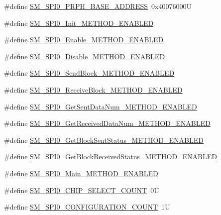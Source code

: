 \begin{DoxyCompactItemize}
\item 
\#define \hyperlink{group___s_m___s_p_i0__module_gadcb4c41a999e49a2af44097b78f649e5}{S\-M\-\_\-\-S\-P\-I0\-\_\-\-P\-R\-P\-H\-\_\-\-B\-A\-S\-E\-\_\-\-A\-D\-D\-R\-E\-S\-S}~0x40076000\-U
\item 
\#define \hyperlink{group___s_m___s_p_i0__module_gaa6b6e643013a5c7cc17c0c739c49f949}{S\-M\-\_\-\-S\-P\-I0\-\_\-\-Init\-\_\-\-M\-E\-T\-H\-O\-D\-\_\-\-E\-N\-A\-B\-L\-E\-D}
\item 
\#define \hyperlink{group___s_m___s_p_i0__module_ga7f2a9dc3bb16477dbf2980b1cf9d9b4f}{S\-M\-\_\-\-S\-P\-I0\-\_\-\-Enable\-\_\-\-M\-E\-T\-H\-O\-D\-\_\-\-E\-N\-A\-B\-L\-E\-D}
\item 
\#define \hyperlink{group___s_m___s_p_i0__module_ga62e6171426870273264bc9b00d3c099f}{S\-M\-\_\-\-S\-P\-I0\-\_\-\-Disable\-\_\-\-M\-E\-T\-H\-O\-D\-\_\-\-E\-N\-A\-B\-L\-E\-D}
\item 
\#define \hyperlink{group___s_m___s_p_i0__module_ga42771fed4a25a87f049c8a78d13220d2}{S\-M\-\_\-\-S\-P\-I0\-\_\-\-Send\-Block\-\_\-\-M\-E\-T\-H\-O\-D\-\_\-\-E\-N\-A\-B\-L\-E\-D}
\item 
\#define \hyperlink{group___s_m___s_p_i0__module_ga60b81caadf218efa734fdca08c338e8d}{S\-M\-\_\-\-S\-P\-I0\-\_\-\-Receive\-Block\-\_\-\-M\-E\-T\-H\-O\-D\-\_\-\-E\-N\-A\-B\-L\-E\-D}
\item 
\#define \hyperlink{group___s_m___s_p_i0__module_ga743f369621e807827351bef66d506609}{S\-M\-\_\-\-S\-P\-I0\-\_\-\-Get\-Sent\-Data\-Num\-\_\-\-M\-E\-T\-H\-O\-D\-\_\-\-E\-N\-A\-B\-L\-E\-D}
\item 
\#define \hyperlink{group___s_m___s_p_i0__module_ga1d1346d5713d7651a7610a945bb4743a}{S\-M\-\_\-\-S\-P\-I0\-\_\-\-Get\-Received\-Data\-Num\-\_\-\-M\-E\-T\-H\-O\-D\-\_\-\-E\-N\-A\-B\-L\-E\-D}
\item 
\#define \hyperlink{group___s_m___s_p_i0__module_ga5e78a13c94e65af89bf24fe10a6f8fba}{S\-M\-\_\-\-S\-P\-I0\-\_\-\-Get\-Block\-Sent\-Status\-\_\-\-M\-E\-T\-H\-O\-D\-\_\-\-E\-N\-A\-B\-L\-E\-D}
\item 
\#define \hyperlink{group___s_m___s_p_i0__module_ga84ccd512971c64d8e17946ddc24a885e}{S\-M\-\_\-\-S\-P\-I0\-\_\-\-Get\-Block\-Received\-Status\-\_\-\-M\-E\-T\-H\-O\-D\-\_\-\-E\-N\-A\-B\-L\-E\-D}
\item 
\#define \hyperlink{group___s_m___s_p_i0__module_ga00df8fcb97f07aeccd2a59e212677943}{S\-M\-\_\-\-S\-P\-I0\-\_\-\-Main\-\_\-\-M\-E\-T\-H\-O\-D\-\_\-\-E\-N\-A\-B\-L\-E\-D}
\item 
\#define \hyperlink{group___s_m___s_p_i0__module_ga42710d1b5fbb9863db90ba2505dcb5d0}{S\-M\-\_\-\-S\-P\-I0\-\_\-\-C\-H\-I\-P\-\_\-\-S\-E\-L\-E\-C\-T\-\_\-\-C\-O\-U\-N\-T}~0\-U
\item 
\#define \hyperlink{group___s_m___s_p_i0__module_ga81e065293d6ca3dfea612fcb4c489dd3}{S\-M\-\_\-\-S\-P\-I0\-\_\-\-C\-O\-N\-F\-I\-G\-U\-R\-A\-T\-I\-O\-N\-\_\-\-C\-O\-U\-N\-T}~1\-U
\end{DoxyCompactItemize}
